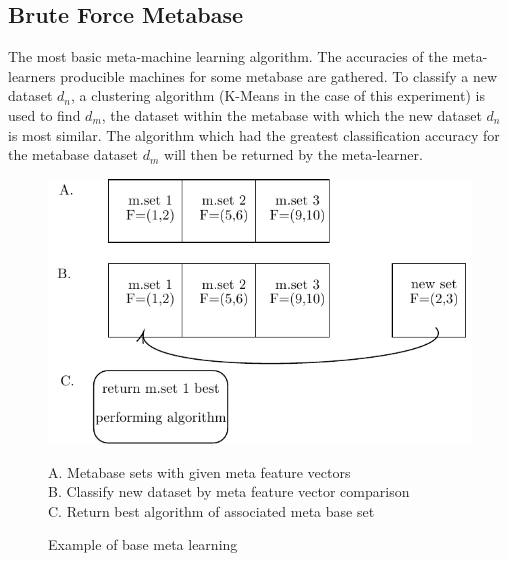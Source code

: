 \subsection{Brute Force Metabase}
The most basic meta-machine learning algorithm. The accuracies of the
meta-learners producible machines for some metabase are gathered. To classify
a new dataset $d_n$, a clustering algorithm (K-Means in the case of this experiment) is
used to find $d_m$, the dataset within the metabase with which the new dataset $d_n$ is
most similar. The algorithm which had the greatest classification accuracy for
the metabase dataset $d_m$ will then be returned by the meta-learner.
\begin{figure}[h]
\includegraphics{Chapters/Images/BaseLearner/BaseLearner.pdf}
\caption{Example of base meta learning}
\centering
\begin{flushleft}
A. Metabase sets with given meta feature vectors \\
B. Classify new dataset by meta feature vector comparison \\
C. Return best algorithm of associated meta base set
\end{flushleft}
\end{figure}
